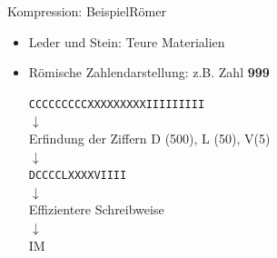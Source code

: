 \begin{frame}{Kompression: Beispiel}{Römer }
	\begin{itemize}
		\item Leder und Stein: Teure Materialien
		\item Römische Zahlendarstellung: z.B. Zahl \textbf{999}
		\begin{center}
			\texttt{CCCCCCCCCXXXXXXXXXIIIIIIIII}\\
			$\downarrow$\\
			Erfindung der Ziffern D (500), L (50), V(5)\\
			$\downarrow$\\
			\texttt{DCCCCLXXXXVIIII} \\
			$\downarrow$\\
			Effizientere Schreibweise\\
			$\downarrow$\\
			IM
		\end{center}
	\end{itemize}
\end{frame}